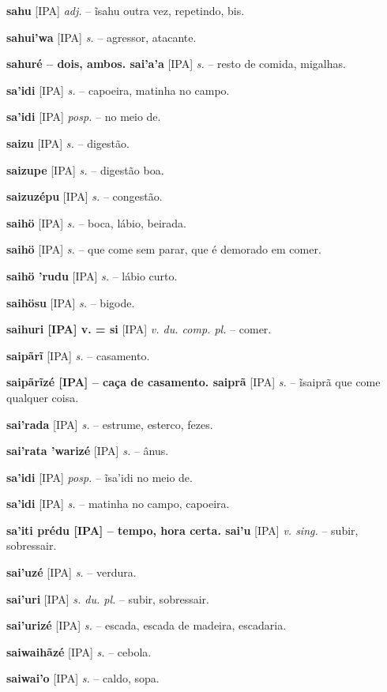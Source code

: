 {\textbf{sahu} [IPA] \textit{adj.} -- ĩsahu outra vez, repetindo, bis.

\textbf{sahui'wa} [IPA] \textit{s.} -- agressor, atacante.

\textbf{sahuré -- dois, ambos. sai'a'a} [IPA] \textit{s.} -- resto de comida, migalhas.

\textbf{sa'idi} [IPA] \textit{s.} -- capoeira, matinha no campo.

\textbf{sa'idi} [IPA] \textit{posp.} -- no meio de.

\textbf{saizu} [IPA] \textit{s.} -- digestão.

\textbf{saizupe} [IPA] \textit{s.} -- digestão boa.

\textbf{saizuzépu} [IPA] \textit{s.} -- congestão.

\textbf{saihö} [IPA] \textit{s.} -- boca, lábio, beirada.

\textbf{saihö} [IPA] \textit{s.} -- que come sem parar, que é demorado em comer.

\textbf{saihö 'rudu} [IPA] \textit{s.} -- lábio curto.

\textbf{saihösu} [IPA] \textit{s.} -- bigode.

\textbf{saihuri [IPA] v. = si} [IPA] \textit{v. du. comp. pl.} -- comer.

\textbf{saipãrĩ} [IPA] \textit{s.} -- casamento.

\textbf{saipãrĩzé [IPA]  -- caça de casamento. saiprã} [IPA] \textit{s.} -- ĩsaiprã que come qualquer coisa.

\textbf{sai'rada} [IPA] \textit{s.} -- estrume, esterco, fezes.

\textbf{sai'rata 'warizé} [IPA] \textit{s.} -- ânus.

\textbf{sa'idi} [IPA] \textit{posp.} -- ĩsa'idi no meio de.

\textbf{sa'idi} [IPA] \textit{s.} -- matinha no campo, capoeira.

\textbf{sa'iti prédu [IPA]  -- tempo, hora certa. sai'u} [IPA] \textit{v. sing.} -- subir, sobressair.

\textbf{sai'uzé} [IPA] \textit{s.} -- verdura.

\textbf{sai'uri} [IPA] \textit{s. du. pl.} -- subir, sobressair.

\textbf{sai'urizé} [IPA] \textit{s.} -- escada, escada de madeira, escadaria.

\textbf{saiwaihãzé} [IPA] \textit{s.} -- cebola.

\textbf{saiwai'o} [IPA] \textit{s.} -- caldo, sopa.

}
